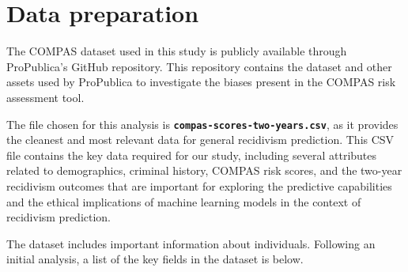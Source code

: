

\section{Data preparation}

The COMPAS dataset used in this study is publicly available through ProPublica's GitHub repository\cite{larson2016compas}. This repository contains the dataset and other assets used by ProPublica to investigate the biases present in the COMPAS risk assessment tool.

The file chosen for this analysis is \textbf{\texttt{compas-scores-two-years.csv}}, as it provides the cleanest and most relevant data for general recidivism prediction. This CSV file contains the key data required for our study, including several attributes related to demographics, criminal history, COMPAS risk scores, and the two-year recidivism outcomes that are important for exploring the predictive capabilities and the ethical implications of machine learning models in the context of recidivism prediction. 

The dataset includes important information about individuals. Following an initial analysis, a list of the key fields in the dataset is below.

